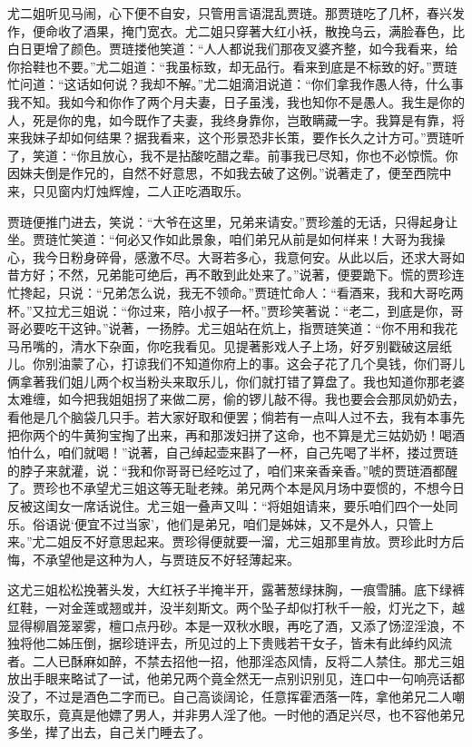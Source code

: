 \begin{parag}
    尤二姐听见马闹，心下便不自安，只管用言语混乱贾琏。那贾琏吃了几杯，春兴发作，便命收了酒果，掩门宽衣。尤二姐只穿著大红小袄，散挽乌云，满脸春色，比白日更增了颜色。贾琏搂他笑道：“人人都说我们那夜叉婆齐整，如今我看来，给你拾鞋也不要。”尤二姐道：“我虽标致，却无品行。看来到底是不标致的好。”贾琏忙问道：“这话如何说？我却不解。”尤二姐滴泪说道：“你们拿我作愚人待，什么事我不知。我如今和你作了两个月夫妻，日子虽浅，我也知你不是愚人。我生是你的人，死是你的鬼，如今既作了夫妻，我终身靠你，岂敢瞒藏一字。我算是有靠，将来我妹子却如何结果？据我看来，这个形景恐非长策，要作长久之计方可。”贾琏听了，笑道：“你且放心，我不是拈酸吃醋之辈。前事我已尽知，你也不必惊慌。你因妹夫倒是作兄的，自然不好意思，不如我去破了这例。”说著走了，便至西院中来，只见窗内灯烛辉煌，二人正吃酒取乐。
\end{parag}


\begin{parag}
    贾琏便推门进去，笑说：“大爷在这里，兄弟来请安。”贾珍羞的无话，只得起身让坐。贾琏忙笑道：“何必又作如此景象，咱们弟兄从前是如何样来！大哥为我操心，我今日粉身碎骨，感激不尽。大哥若多心，我意何安。从此以后，还求大哥如昔方好；不然，兄弟能可绝后，再不敢到此处来了。”说著，便要跪下。慌的贾珍连忙搀起，只说：“兄弟怎么说，我无不领命。”贾琏忙命人：“看酒来，我和大哥吃两杯。”又拉尤三姐说：“你过来，陪小叔子一杯。”贾珍笑著说：“老二，到底是你，哥哥必要吃干这钟。”说著，一扬脖。尤三姐站在炕上，指贾琏笑道：“你不用和我花马吊嘴的，清水下杂面，你吃我看见。见提著影戏人子上场，好歹别戳破这层纸儿。你别油蒙了心，打谅我们不知道你府上的事。这会子花了几个臭钱，你们哥儿俩拿著我们姐儿两个权当粉头来取乐儿，你们就打错了算盘了。我也知道你那老婆太难缠，如今把我姐姐拐了来做二房，偷的锣儿敲不得。我也要会会那凤奶奶去，看他是几个脑袋几只手。若大家好取和便罢；倘若有一点叫人过不去，我有本事先把你两个的牛黄狗宝掏了出来，再和那泼妇拼了这命，也不算是尤三姑奶奶！喝酒怕什么，咱们就喝！”说著，自己绰起壶来斟了一杯，自己先喝了半杯，搂过贾琏的脖子来就灌，说：“我和你哥哥已经吃过了，咱们来亲香亲香。”唬的贾琏酒都醒了。贾珍也不承望尤三姐这等无耻老辣。弟兄两个本是风月场中耍惯的，不想今日反被这闺女一席话说住。尤三姐一叠声又叫：“将姐姐请来，要乐咱们四个一处同乐。俗语说‘便宜不过当家’，他们是弟兄，咱们是姊妹，又不是外人，只管上来。”尤二姐反不好意思起来。贾珍得便就要一溜，尤三姐那里肯放。贾珍此时方后悔，不承望他是这种为人，与贾琏反不好轻薄起来。
\end{parag}


\begin{parag}
    这尤三姐松松挽著头发，大红袄子半掩半开，露著葱绿抹胸，一痕雪脯。底下绿裤红鞋，一对金莲或翘或并，没半刻斯文。两个坠子却似打秋千一般，灯光之下，越显得柳眉笼翠雾，檀口点丹砂。本是一双秋水眼，再吃了酒，又添了饧涩淫浪，不独将他二姊压倒，据珍琏评去，所见过的上下贵贱若干女子，皆未有此绰约风流者。二人已酥麻如醉，不禁去招他一招，他那淫态风情，反将二人禁住。那尤三姐放出手眼来略试了一试，他弟兄两个竟全然无一点别识别见，连口中一句响亮话都没了，不过是酒色二字而已。自己高谈阔论，任意挥霍洒落一阵，拿他弟兄二人嘲笑取乐，竟真是他嫖了男人，并非男人淫了他。一时他的酒足兴尽，也不容他弟兄多坐，撵了出去，自己关门睡去了。
\end{parag}


